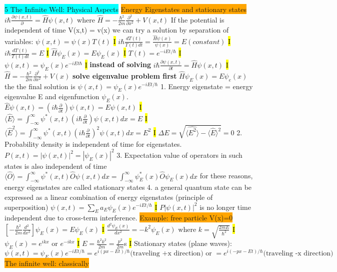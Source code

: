 \documentclass[fontsize=4pt]{scrartcl}
\begin{document}
\colorbox{Cyan}{5 The Infinite Well: Physical Aspects}
\colorbox{Orange}{Energy Eigenstates and stationary states}
$i\hbar\frac{\partial \psi (x,t)}{\partial} = \hat{H}\psi (x,t)$ where $ \hat{H} = -\frac{\hbar^2}{2m}\frac{\partial^2}{\partial x^2} + V(x,t)$
If the potential is independent of time V(x,t) = v(x) we can try a solution by separation of variables:
$\psi(x,t) = \psi(x) T(t)$
\hl{I}
$i\hbar \frac{dT(t)}{T(t) dt}=\frac{\hat{H}\psi(x)}{\psi(x)} = E (constant)$
\hl{I}
$i\hbar \frac{dT(t)}{T(t) dt} = E$
\hl{I}
$\hat{H}\psi_E(x) = E\psi_E(x)$
\hl{I}
$T(t) = e^{-iEt / \hbar}$
\hl{I}
$\psi(x,t) = \psi_E(x) e^{-iEt\hbar}$
\hl{I}
\textbf{instead of solving}
$i\hbar \frac{\partial \psi(x,t)}{\partial t} = \hat{H} \psi(x,t)$
\hl{I}
$\hat{H} = -\frac{\hbar^2}{2m}\frac{\partial^2}{\partial x^2} + V(x)$
\textbf{solve eigenvalue problem first}
$\hat{H} \psi_E(x) = E\psi_e(x)$ the the final solution is $\psi(x,t) = \psi_E (x) e^{-iEt/\hbar}$
1. Energy eigenstate = energy eigenvalue E and eigenfunction $\psi_E(x)$.
$\hat{E}\psi(x,t) = (i\hbar \frac{\partial}{\partial t})\psi (x,t) = E\psi(x,t)$
\hl{I}
$\langle \hat{E} \rangle = \int_{-\infty}^{\infty}\psi^*(x,t)(i\hbar \frac{\partial}{\partial t})\psi(x,t) dx = E$
\hl{I}
$\langle \hat{E}^2 \rangle = \int_{-\infty}^{\infty}\psi^*(x,t)(i\hbar \frac{\partial}{\partial t})^2\psi(x,t) dx = E^2$
\hl{I}
$\Delta E = \sqrt{\langle \hat{E^2} \rangle - \langle \hat{E} \rangle^2 } = 0$
2. Probability density is independent of time for eigenstates.
$P(x,t) = |\psi(x,t)|^2 = |\psi_E(x)|^2$
3. Expectation value of operators in such states is also independent of time
$\langle \hat{O} \rangle = \int_{-\infty}^{\infty} \psi^* (x,t) \hat{O}\psi(x,t) dx = \int_{-\infty}^{\infty} \psi_E^* (x) \hat{O} \psi_E(x)dx$
for these reasons, energy eigenstates are called stationary states
4. a general quantum state can be expressed as a linear combination of energy eigenstates (principle of superposition)
$\psi(x,t) = \sum_E a_E \psi_E (x)e^{-iEt/\hbar}$
\hl{I}
$P|\psi(x,t)|^2$ is no longer time independent due to cross-term interference.
\colorbox{Orange}{Example: free particle V(x)=0}
$[-\frac{\hbar^2}{2m}\frac{d^2}{dx^2}]\psi_E(x) =  E\psi_E (x)$
\hl{I}
$\frac{d^2 \psi_E(x)}{dx^2} = -k^2 \psi_E (x) \text{ where } k = \sqrt{\frac{2mE}{\hbar^2}}$
\hl{I}
$\psi_E(x) = e^{ikx} \text{ or } e^{-ikx}$
\hl{I}
$E = \frac{\hbar^2 k^2}{2m} = \frac{p^2}{2m}$s
\hl{I}
Stationary states (plane waves):
$\psi(x,t) = \psi_E (x) e^{-iEt/\hbar} = e^{i(px-Et)/\hbar} \text{(traveling +x direction) or } = e^{i(-px-Et)/\hbar} \text{(traveling -x direction)}$
\colorbox{Orange}{The infinite well: classically}
\end{document}
